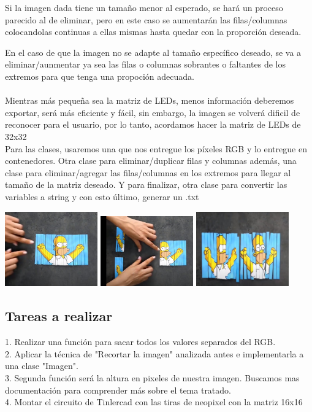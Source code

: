 \documentclass{article}
\begin{document}
Si la imagen dada tiene un tamaño menor al esperado, se hará un proceso parecido al de eliminar, pero en este caso se aumentarán las filas/columnas colocandolas continuas a ellas mismas  hasta quedar con la proporción deseada.

En el caso de que la imagen no se adapte al tamaño específico deseado, se va a eliminar/aunmentar ya sea las filas o columnas sobrantes o faltantes de los extremos para que tenga una propoción adecuada.\\
\\Mientras más pequeña sea la matriz de LEDs, menos información deberemos exportar, será más eficiente y fácil, sin embargo, la imagen se volverá dificil de reconocer para el usuario, por lo tanto, acordamos hacer la matriz de LEDs de 32x32\\


Para las clases, usaremos una que nos entregue los píxeles RGB y lo entregue en contenedores. Otra clase para eliminar/duplicar filas y columnas además, una clase para eliminar/agregar las filas/columnas en los extremos para llegar al tamaño de la matriz deseado. Y para finalizar, otra clase para convertir las variables a string y con esto último, generar un .txt


\includegraphics[width=4cm]{Imagenes/recorte1.jpeg}
\includegraphics[width=4cm]{Imagenes/recorte2.jpeg}
\includegraphics[width=4cm]{Imagenes/recorte3.jpeg}
\vspace{0,3cm}

\subsection{Tareas a realizar}
1. Realizar una función para sacar todos los valores separados del RGB.\\
2. Aplicar la técnica de "Recortar la imagen" analizada antes e implementarla a una clase "Imagen".\\
3. Segunda función será la altura en pixeles de nuestra imagen. Buscamos mas documentación para comprender más sobre el tema tratado.\\
4. Montar el circuito de Tinlercad con las tiras de neopixel con la matriz 16x16
\end{document}

